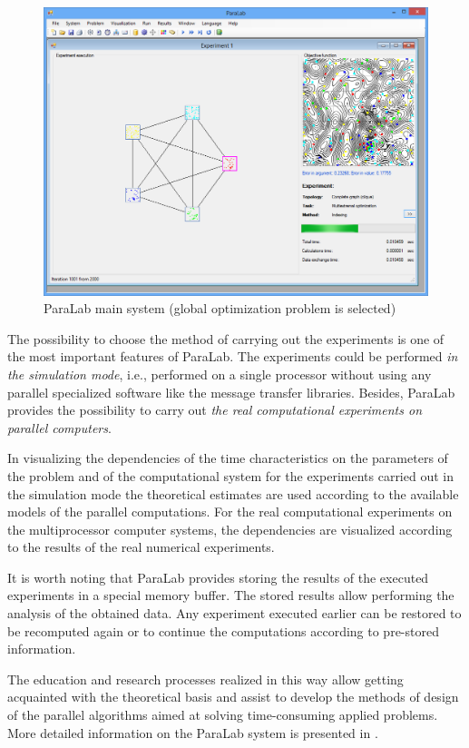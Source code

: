 \begin{figure}[t]
\includegraphics[width=1.0\linewidth]{figures/7_2.png}
\caption{ParaLab main system (global optimization problem is selected)}
\label{7_fig_2}     
\end{figure}

The possibility to choose the method of carrying out the experiments is one of the most important features of ParaLab. The experiments could be performed \textit{in the simulation mode}, i.e., performed on a single processor without using any parallel specialized software like the message transfer libraries. Besides, ParaLab provides the possibility to carry out \textit{the real computational experiments on parallel computers}.

In visualizing the dependencies of the time characteristics on the parameters of the problem and of the computational system for the experiments carried out in the simulation mode the theoretical estimates are used according to the available models of the parallel computations. For the real computational experiments on the multiprocessor computer systems, the dependencies are visualized according to the results of the real numerical experiments. 

It is worth noting that ParaLab provides storing the results of the executed experiments in a special memory buffer. The stored results allow performing the analysis of the obtained data. Any experiment executed earlier can be restored to be recomputed again or to continue the computations according to pre-stored information. 

The education and research processes realized in this way allow getting acquainted with the theoretical basis and assist to develop the methods of design of the parallel algorithms aimed at solving time-consuming applied problems. More detailed information on the ParaLab system is presented in \cite{7_Gergel2010}.


